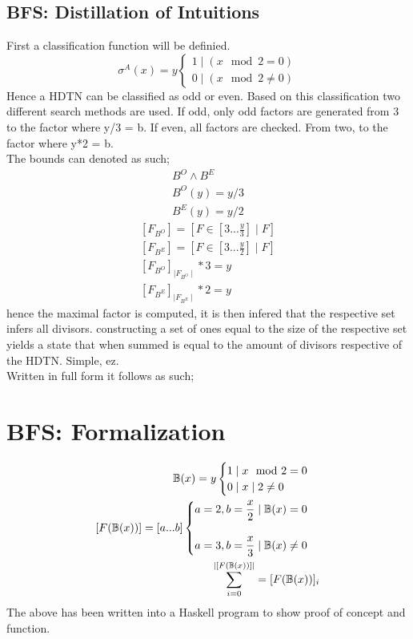 \documentclass{article}
\begin{document}
\subsection{BFS: Distillation of Intuitions}
First a classification function will be definied.
\begin{equation}
\sigma^A(x)= y 
\begin{cases}
1\mid (x\mod 2 = 0) \\
0\mid (x\mod 2 \not= 0)
\end{cases}
\end{equation}
Hence a HDTN can be classified as odd or even. Based on this classification two different search methods are
used. If odd, only odd factors are generated from 3 to the factor where y/3 = b. If even, all factors are
checked. From two, to the factor where y*2 = b.\\
The bounds can denoted as such;
\begin{subequations}
\begin{align}
	B^O\land B^E\\
	B^O(y) = y/3\\
	B^E(y) = y/2
\end{align}
\end{subequations}
\begin{subequations}
\begin{align}
	[F_{B^O}] = [F\in[3...\frac{y}{3}]\mid F]\\
	[F_{B^E}] = [F\in[3...\frac{y}{2}]\mid F]\\
	[F_{B^O}]_{\mid F_{B^O}\mid}*3=y\\
	[F_{B^E}]_{\mid F_{B^E}\mid}*2=y 
\end{align}
\end{subequations}
hence the maximal factor is computed, it is then infered that the respective set infers all divisors.
constructing a set of ones equal to the size of the respective set yields a state that when summed is 
equal to the amount of divisors respective of the HDTN. Simple, ez.\\
Written in full form it follows as such;
\section{BFS: Formalization}
\begin{subequations}
\begin{align}
	\mathbb{B}(x)= y\begin{cases}1\mid x\mod2=0\\
	0\mid x\mid2\not=0 \end{cases}\\
	[F({\mathbb{B}(x)})]=[a...b]
	\begin{cases}
		a=2,b=\dfrac{x}{2}\mid \mathbb{B}(x)=0\\
		{\color{white}-}\\
		a=3,b=\dfrac{x}{3}\mid\mathbb{B}(x)\not=0
	\end{cases}\\
	\sum_{i=0}^{\mid[F(\mathbb{B}(x))]\mid}=[F(\mathbb{B}(x))]_i
\end{align}
\end{subequations}
The above has been written into a Haskell program to show proof of concept and function.
\end{document}
